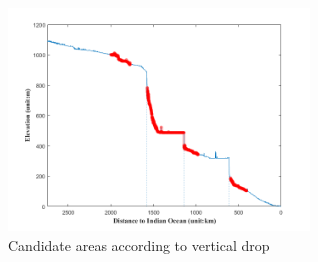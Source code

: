 \documentclass{mcmthesis}
\begin{document}
\begin{figure}[h]
\small
\centering
\includegraphics[width=8cm]{./figures/highlight1.png}
\caption{Candidate areas according to vertical drop} \label{fig:Fig3}
\end{figure}
\end{document}
